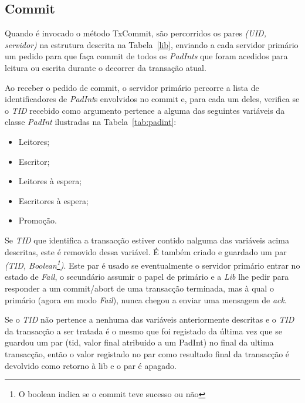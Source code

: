 \subsection{Commit}

Quando é invocado o método TxCommit, são percorridos os pares \textit{(UID, servidor)} na estrutura descrita na Tabela~\ref{lib}, enviando a cada servidor primário um pedido para que faça commit de todos os \textit{PadInts} que foram acedidos para leitura ou escrita durante o decorrer da transação atual.

Ao receber o pedido de commit, o servidor primário percorre a lista de identificadores de \textit{PadInt}s envolvidos no commit e, para cada um deles, verifica se o \textit{TID} recebido como argumento pertence a alguma das seguintes variáveis da classe \textit{PadInt} ilustradas na Tabela~\ref{tab:padint}:
\begin{itemize}
	\item Leitores;
	\item Escritor;
	\item Leitores à espera;
	\item Escritores à espera;
	\item Promoção.
\end{itemize}

Se \textit{TID} que identifica a transacção estiver contido nalguma das variáveis acima descritas, este é removido dessa variável. É também criado e guardado um par \textit{(TID, Boolean\footnote{O boolean indica se o commit teve sucesso ou não})}. Este par é usado se eventualmente o servidor primário entrar no estado de \textit{Fail}, o secundário assumir o papel de primário e a \textit{Lib} lhe pedir para responder a um commit/abort de uma transacção terminada, mas à qual o primário (agora em modo \textit{Fail}), nunca chegou a enviar uma mensagem de \textit{ack}.

Se o \textit{TID} não pertence a nenhuma das variáveis anteriormente descritas e o \textit{TID} da transacção a ser tratada é o mesmo que foi registado da última vez que se guardou um par (tid, valor final atribuido a um PadInt) no final da ultima transacção, então o valor registado no par como resultado final da transacção é devolvido como retorno à lib e o par é apagado.
